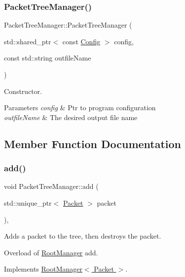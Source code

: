 \subsubsection{\texorpdfstring{Packet\+Tree\+Manager()}{PacketTreeManager()}}
{\footnotesize\ttfamily Packet\+Tree\+Manager\+::\+Packet\+Tree\+Manager (\begin{DoxyParamCaption}\item[{std\+::shared\+\_\+ptr$<$ const \hyperlink{class_config}{Config} $>$}]{config,  }\item[{const std\+::string}]{outfile\+Name }\end{DoxyParamCaption})}



Constructor. 


\begin{DoxyParams}{Parameters}
{\em config} & Ptr to program configuration \\
\hline
{\em outfile\+Name} & The desired output file name \\
\hline
\end{DoxyParams}


\subsection{Member Function Documentation}
\mbox{\label{class_packet_tree_manager_a855e71512fe6365c11f312584afff70a}} 
\subsubsection{\texorpdfstring{add()}{add()}}
{\footnotesize\ttfamily void Packet\+Tree\+Manager\+::add (\begin{DoxyParamCaption}\item[{std\+::unique\+\_\+ptr$<$ \hyperlink{class_packet}{Packet} $>$}]{packet }\end{DoxyParamCaption})\hspace{0.3cm}{\ttfamily [final]}, {\ttfamily [virtual]}}



Adds a packet to the tree, then destroys the packet. 

Overload of \hyperlink{class_root_manager}{Root\+Manager} add. 

Implements \hyperlink{class_root_manager_a2f05eb45d5eaee1f9f12e299395652fb}{Root\+Manager$<$ Packet $>$}.


